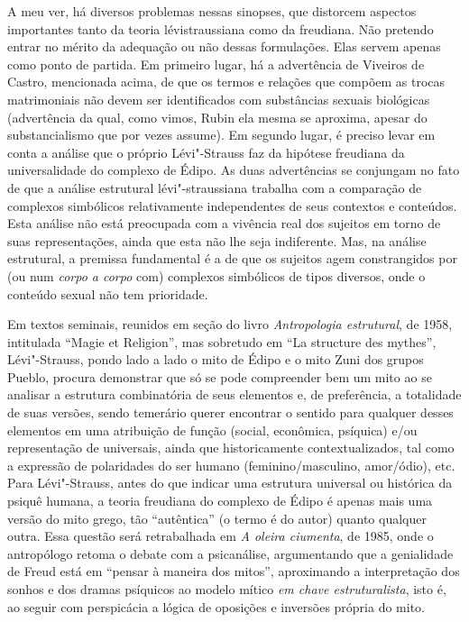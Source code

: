 A meu ver, há diversos problemas nessas sinopses, que distorcem aspectos
importantes tanto da teoria lévistraussiana como da freudiana. Não
pretendo entrar no mérito da adequação ou não dessas formulações. Elas
servem apenas como ponto de partida. Em primeiro lugar, há a advertência
de Viveiros de Castro, mencionada acima, de que os termos e relações que
compõem as trocas matrimoniais não devem ser identificados com
substâncias sexuais biológicas (advertência da qual, como vimos, Rubin
ela mesma se aproxima, apesar do substancialismo que por vezes assume).
Em segundo lugar, é preciso levar em conta a análise que o próprio
Lévi"-Strauss faz da hipótese freudiana da universalidade do complexo de
Édipo. As duas advertências se conjungam no fato de que a análise
estrutural lévi"-straussiana trabalha com a comparação de complexos
simbólicos relativamente independentes de seus contextos e conteúdos.
Esta análise não está preocupada com a vivência real dos sujeitos em
torno de suas representações, ainda que esta não lhe seja indiferente.
Mas, na análise estrutural, a premissa fundamental é a de que os
sujeitos agem constrangidos por (ou num \emph{corpo a corpo} com)
complexos simbólicos de tipos diversos, onde o conteúdo sexual não tem
prioridade.

Em textos seminais, reunidos em seção do livro \emph{Antropologia
estrutural}, de 1958, intitulada ``Magie et Religion'', mas sobretudo em
``La structure des mythes'', Lévi"-Strauss, pondo lado a lado o mito de
Édipo e o mito Zuni dos grupos Pueblo, procura demonstrar que só se pode
compreender bem um mito ao se analisar a estrutura combinatória de seus
elementos e, de preferência, a totalidade de suas versões, sendo
temerário querer encontrar o sentido para qualquer desses elementos em
uma atribuição de função (social, econômica, psíquica) e/ou
representação de universais, ainda que historicamente contextualizados,
tal como a expressão de polaridades do ser humano (feminino/masculino,
amor/ódio), etc. Para Lévi"-Strauss, antes do que indicar uma estrutura
universal ou histórica da psiquê humana, a teoria freudiana do complexo
de Édipo é apenas mais uma versão do mito grego, tão ``autêntica'' (o
termo é do autor) quanto qualquer outra. Essa questão será retrabalhada
em \emph{A oleira ciumenta}, de 1985, onde o antropólogo retoma o debate
com a psicanálise, argumentando que a genialidade de Freud está em
``pensar à maneira dos mitos'', aproximando a interpretação dos sonhos e
dos dramas psíquicos ao modelo mítico \emph{em chave estruturalista},
isto é, ao seguir com perspicácia a lógica de oposições e inversões
própria do mito.

